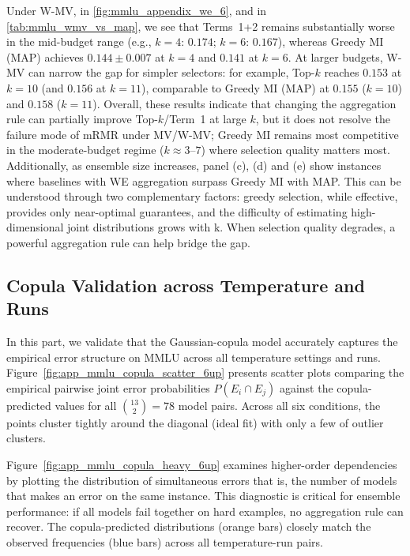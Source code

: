 \documentclass{article}
\theoremstyle{plain}
\theoremstyle{definition}
\theoremstyle{remark}
\begin{document}
Under W-MV, in \cref{fig:mmlu_appendix_we_6}, and in \cref{tab:mmlu_wmv_vs_map}, we see that Terms~1+2 remains substantially worse in the mid-budget range (e.g., $k=4$: $0.174$; $k=6$: $0.167$), whereas Greedy MI (MAP) achieves $0.144 \pm 0.007$ at $k=4$ and $0.141$ at $k=6$.
At larger budgets, W-MV can narrow the gap for simpler selectors: for example, Top-$k$ reaches $0.153$ at $k=10$ (and $0.156$ at $k=11$), comparable to Greedy MI (MAP) at $0.155$ ($k=10$) and $0.158$ ($k=11$).
Overall, these results indicate that changing the aggregation rule can partially improve Top-$k$/Term~1 at large $k$, but it does not resolve the failure mode of mRMR under MV/W-MV; Greedy MI remains most competitive in the moderate-budget regime ($k \approx 3$--$7$) where selection quality matters most. Additionally, as ensemble size increases, panel (c), (d) and (e) show instances where baselines with WE aggregation surpass Greedy MI with MAP. This can be understood through two complementary factors: greedy selection, while effective, provides only near-optimal guarantees, and the difficulty of estimating high-dimensional joint distributions grows with k. When selection quality degrades, a powerful aggregation rule can help bridge the gap.

\newpage
\subsection{Copula Validation across Temperature and Runs}
In this part, we validate that the Gaussian-copula model accurately captures the empirical error structure on MMLU across all temperature settings and runs. Figure~\ref{fig:app_mmlu_copula_scatter_6up} presents scatter plots comparing the empirical pairwise joint error probabilities $P(E_i \cap E_j)$ against the copula-predicted values for all $\binom{13}{2} = 78$ model pairs. Across all six conditions, the points cluster tightly around the diagonal (ideal fit) with only a few of outlier clusters.

Figure~\ref{fig:app_mmlu_copula_heavy_6up} examines higher-order dependencies by plotting the distribution of simultaneous errors that is, the number of models that makes an error on the same instance. This diagnostic is critical for ensemble performance: if all models fail together on hard examples, no aggregation rule can recover. The copula-predicted distributions (orange bars) closely match the observed frequencies (blue bars) across all temperature-run pairs.
\label{app:copula_validation_mmlu}
\end{document}
